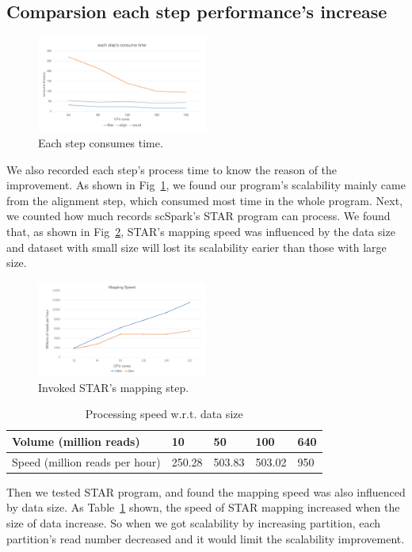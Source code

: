 \documentclass[conference]{IEEEtran}
\begin{document}
\subsection{Comparsion each step performance's increase}
\begin{figure}
  \includegraphics[width=0.5\textwidth]{fig5.pdf}
  \caption{Each step consumes time.} \label{fig5}
\end{figure}
We also recorded each step's process time to know the reason of the improvement.
As shown in Fig~\ref{fig5}, we found our program's scalability mainly came from the alignment step, which consumed most time in the whole program.
Next, we counted how much records scSpark's STAR program can process.
We found that, as shown in Fig~\ref{fig6}, STAR's mapping speed was influenced by the data size and dataset with small size will lost its scalability earier than those with large size.
\begin{figure}
  \includegraphics[width=0.5\textwidth]{fig6.pdf}
  \caption{Invoked STAR's mapping step.} \label{fig6}
\end{figure}

\begin{table}
    \centering
    \caption{Processing speed w.r.t. data size}\label{tab3}
    \begin{tabular}{|l | l | l | l | l|}
    \hline
    Volume (million reads) & 10 & 50 & 100 & 640 \\
    \hline
    Speed (million reads per hour) & 250.28 & 503.83 & 503.02 & 950 \\
    \hline
    \end{tabular}
  \end{table}
  
  Then we tested STAR program, and found the mapping speed was also influenced by data size. 
  As Table~\ref{tab3} shown, the speed of STAR mapping increased when the size of data increase. 
  So when we got scalability by increasing partition, each partition's read number decreased and it would limit the scalability improvement. 
  
\end{document}
